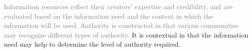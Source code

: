 \documentclass[17pt]{extarticle}
\begin{document}
{{\begin{center}
\end{center}

}

\newpage


{\Huge

  \begin{center}

\textcolor{gray}{Information resources reflect their creators’ expertise and credibility, and are evaluated based on the information need and the context in which the information will be used. Authority is constructed in that various communities may recognize different types of authority.} It is contextual in that the information need may help to determine the level of authority required.

\end{center}

}

\newpage


\vspace*{1in}

{\Huge

\begin{center}

   \\
  \vspace{1in}
   \\
  \vspace{1in}

\end{center}

\newpage



}}
\end{document}
